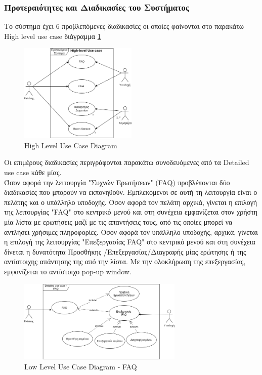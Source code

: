 \subsubsection{Προτεραιότητες και Διαδικασίες του Συστήματος}
Το σύστημα έχει 6 προβλεπόμενες διαδικασίες οι οποίες φαίνονται στο παρακάτω High level use case διάγραμμα \ref{high_level_use_case}  
\begin{figure}[H]
	\centering
	\includegraphics[width=0.5\textwidth]{Images/High_level_use_case}
	\caption{High Level Use Case Diagram}
	\label{high_level_use_case}
\end{figure}

\noindent
Οι επιμέρους διαδικασίες περιγράφονται παρακάτω συνοδευόμενες από τα Detailed use case κάθε μίας. \\

\noindent
Όσον αφορά την λειτουργία "Συχνών Ερωτήσεων" (FAQ) προβλέπονται δύο διαδικασίες που μπορούν να 
εκπονηθούν. Εμπλεκόμενοι σε αυτή τη λειτουργία είναι ο πελάτης και ο υπάλληλο υποδοχής. Όσον αφορά 
τον πελάτη αρχικά, γίνεται η επιλογή της λειτουργίας "FAQ" στο κεντρικό μενού και στη συνέχεια 
εμφανίζεται στον χρήστη μία λίστα με ερωτήσεις μαζί με τις απαντήσεις τους, από τις οποίες μπορεί να 
αντλήσει χρήσιμες πληροφορίες. Όσον αφορά τον υπάλληλο υποδοχής, αρχικά, γίνεται η επιλογή της 
λειτουργίας "Επεξεργασίας FAQ" στο κεντρικό μενού και στη συνέχεια δίνεται η δυνατότητα Προσθήκης
/Επεξεργασίας/Διαγραφής μίας ερώτησης ή της αντίστοιχης απάντησης της από την λίστα. Με την 
ολοκλήρωση  της επεξεργασίας, εμφανίζεται το αντίστοιχο  pop-up window.\\
\begin{figure}[H]
	\centering
	\includegraphics[width=0.7\textwidth]{Images/Low_level_use_case-FAQ}
	\caption{Low Level Use Case Diagram - FAQ}
	\label{Low_level_use_case - FAQ}
\end{figure}
\clearpage

